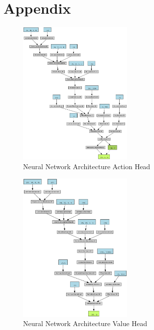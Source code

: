 \chapter{Appendix}
\label{cha:Appendix}



\begin{figure}
    \centering
    \includegraphics[width=0.5\textwidth]{Bilder/action_graph.png}
    \caption{Neural Network Architecture Action Head}
    \label{fig:action_graph}
\end{figure}

\begin{figure}
    \centering
    \includegraphics[width=0.5\textwidth]{Bilder/value_graph.png}
    \caption{Neural Network Architecture Value Head}
    \label{fig:value_graph}
\end{figure}

